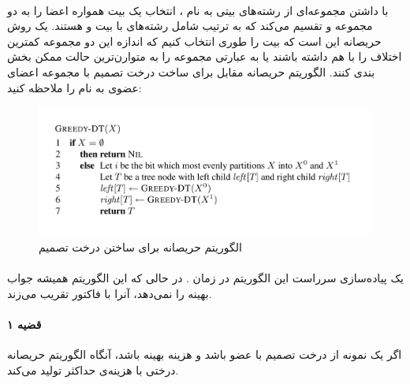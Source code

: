 \documentclass[a4paper]{article}
\begin{document}
	\paragraph{}
	با داشتن مجموعه‌ای از رشته‌های 
	بیتی به نام
	، انتخاب یک بیت
	همواره اعضا را به دو مجموعه 
	و 
	تقسیم می‌کند که به ترتیب شامل رشته‌های با بیت
	و
	هستند. یک روش حریصانه این است که بیت
	را طوری انتخاب کنیم که اندازه این دو مجموعه کمترین اختلاف را با هم داشته باشند یا به عبارتی مجموعه
	را به متوارن‌ترین حالت ممکن بخش بندی کنند. الگوریتم حریصانه مقابل برای ساخت درخت تصمیم با مجموعه اعضای 
	عضوی به نام
	را ملاحظه کنید:
	\newpage
	\begin{figure}[h!]
		\centering
		\includegraphics[width=0.7\linewidth]{Pics/Greedy.png}
		\caption{الگوریتم حریصانه برای ساختن درخت تصمیم}
	\end{figure}
	\paragraph{}
	یک پیاده‌سازی سرراست این الگوریتم در زمان 
	.
	در حالی که این الگوریتم همیشه جواب بهینه را نمی‌دهد، آنرا با فاکتور 
	تقریب می‌زند.
	\paragraph{قضیه ۱}
	اگر
	یک نمونه از درخت تصمیم با
	عضو باشد و هزینه بهینه
	باشد، آنگاه الگوریتم حریصانه درختی با هزینه‌ی حداکثر 
	تولید می‌کند.
\end{document}
